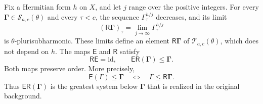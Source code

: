 \begin{theorem}\label{thm:hermitian-system-retraction}
Fix a Hermitian form $h$ on $X$, and let $j$ range over the positive integers. For every $\boldsymbol\Gamma\in\mathscr S_{a,c}(\theta)$ and every $\tau<c$, the sequence $\Gamma^{h/j}_\tau$ decreases, and its limit
\[
 (\mathsf R\boldsymbol\Gamma)_\tau
 =\lim_{j\to\infty}\Gamma^{h/j}_\tau
\]
is $\theta$-plurisubharmonic. These limits define an element $\mathsf R\boldsymbol\Gamma$ of $\mathscr T_{a,c}(\theta)$, which does not depend on $h$. The maps $\mathsf E$ and $\mathsf R$ satisfy
\[
 \mathsf R\mathsf E=\mathrm{id},
 \qquad \mathsf E\mathsf R(\boldsymbol\Gamma)
                       \leq\boldsymbol\Gamma.
\]
Both maps preserve order. More precisely,
\begin{equation}\label{eq:hermitian-system-order-adjunction}
 \mathsf E(\Gamma)\leq\boldsymbol\Gamma
 \quad\Longleftrightarrow\quad
 \Gamma\leq\mathsf R\boldsymbol\Gamma.
\end{equation}
Thus $\mathsf E\mathsf R(\boldsymbol\Gamma)$ is the greatest system below $\boldsymbol\Gamma$ that is realized in the original background.
\end{theorem}
